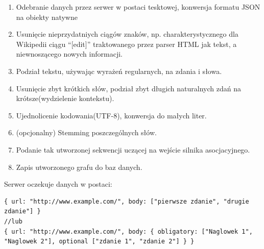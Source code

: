 \begin{enumerate}
\item Odebranie danych przez serwer w postaci tesktowej, konwersja formatu JSON na obiekty natywne
\item Usunięcie nieprzydatniych ciągów znaków, np. charakterystycznego dla Wikipedii ciągu ``[edit]'' traktowanego przez parser HTML jak tekst, a niewnoszącego nowych informacji.
\item Podział tekstu, używając wyrażeń regularnych, na zdania i słowa.
\item Usunięcie zbyt krótkich słów, podział zbyt długich naturalnych zdań na krótsze(wydzielenie kontekstu). 
\item Ujednolicenie kodowania(UTF-8), konwersja do małych liter.
\item (opcjonalny) Stemming poszczególnych słów.
\item Podanie tak utworzonej sekwencji uczącej na wejście silnika asocjacyjnego.
\item Zapis utworzonego grafu do baz danych.
\end{enumerate}

Serwer oczekuje danych w postaci:

\lstset{language =JavaScript}
\begin{lstlisting}
{ url: "http://www.example.com/", body: ["pierwsze zdanie", "drugie zdanie"] }
//lub
{ url: "http://www.example.com/", body: { obligatory: ["Naglowek 1", "Naglowek 2"], optional ["zdanie 1", "zdanie 2"] } }
\end{lstlisting}

